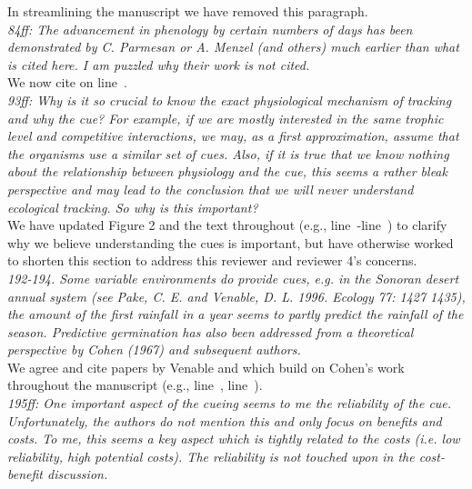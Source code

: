 \documentclass[11pt]{article}
\newcommand{\lr}[1]{line~\lineref{#1}}
\begin{document}
In streamlining the manuscript we have removed this paragraph. \\ 

\emph{84ff: The advancement in phenology by certain numbers of days has been demonstrated by C.
Parmesan or A. Menzel (and others) much earlier than what is cited here. I am puzzled why
their work is not cited.}\\

We now cite \citet{Menzel:2006xn,Parmesan:2006cr} on \lr{r1ass1}.\\

\emph{93ff: Why is it so crucial to know the exact physiological mechanism of tracking and why the
cue? For example, if we are mostly interested in the same trophic level and competitive
interactions, we may, as a first approximation, assume that the organisms use a similar set
of cues. Also, if it is true that we know nothing about the relationship between physiology
and the cue, this seems a rather bleak perspective and may lead to the conclusion that we
will never understand ecological tracking. So why is this important?}\\

We have updated Figure 2 and the text throughout (e.g., \lr{r3birdsS}-\lr{r3birdsE}) to clarify why we believe understanding the cues is important, but have otherwise worked to shorten this section to address this reviewer and reviewer 4's concerns. \\

\emph{192-194. Some variable environments do provide cues, e.g. in the Sonoran desert annual system
(see Pake, C. E. and Venable, D. L. 1996. Ecology 77: 1427 1435), the amount of the first
rainfall in a year seems to partly predict the rainfall of the season. Predictive germination
has also been addressed from a theoretical perspective by Cohen (1967) and subsequent
authors.}\\

We agree and cite papers by Venable and which build on Cohen's work throughout the manuscript (e.g., \lr{r1ass2}, \lr{r1ass4}).\\

\emph{195ff: One important aspect of the cueing seems to me the reliability of the cue.
Unfortunately, the authors do not mention this and only focus on benefits and costs. To me,
this seems a key aspect which is tightly related to the costs (i.e. low reliability, high
potential costs). The reliability is not touched upon in the cost-benefit discussion.}\\
\end{document}

